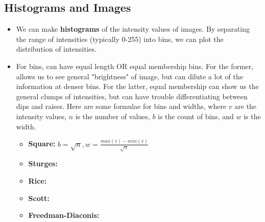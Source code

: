 \documentclass{article}
\begin{document}
\subsection{Histograms and Images}
\begin{itemize}
    \item We can make \textbf{histograms} of the intensity values of images. By separating the range of intensities (typically 0-255) into bins, we can plot the distribution of intensities. 
    \item For bins, can have equal length OR equal membership bins. For the former, allows us to see general "brightness" of image, but can dilute a lot of the information at denser bins. For the latter, equal membership can show us the general clumps of intensities, but can have trouble differentiating between dips and raises. Here are some formulae for bins and widths, where $v$ are the intensity values, $n$ is the number of values, $b$ is the count of bins, and $w$ is the width. 
    \begin{itemize}
        \item \textbf{Square:} $b = \sqrt{n}, w = \frac{max(v)-min(v)}{\sqrt{n}}$
        \item \textbf{Sturges:}
        \item \textbf{Rice:}
        \item \textbf{Scott:}
        \item \textbf{Freedman-Diaconis:}
    \end{itemize}
    
    \newpage
    

\end{itemize}
\end{document}
